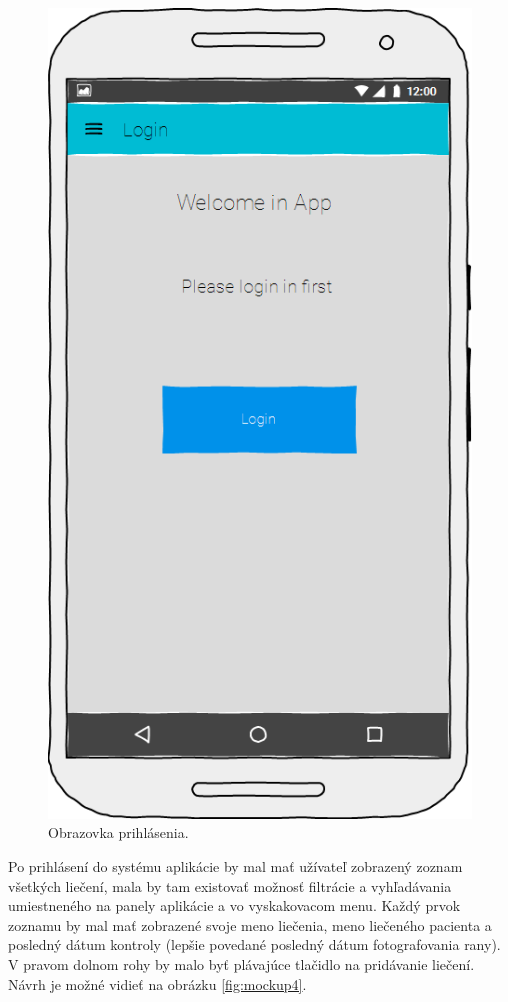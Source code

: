 \begin{figure}[h]
      \centering
      \includegraphics[scale=0.45]{fig/mockup1.png}
      \caption{Obrazovka prihlásenia.}
      \label{fig:mockup1}
\end{figure}

Po prihlásení do systému aplikácie by mal mať užívateľ zobrazený zoznam všetkých liečení, mala by tam existovať možnosť filtrácie a vyhľadávania umiestneného na panely aplikácie a vo vyskakovacom menu. Každý prvok zoznamu by mal mať zobrazené svoje meno liečenia, meno liečeného pacienta a posledný dátum kontroly (lepšie povedané posledný dátum fotografovania rany). V pravom dolnom rohy by malo byť plávajúce tlačidlo na pridávanie liečení. Návrh je možné vidieť na obrázku \ref{fig:mockup4}. 

